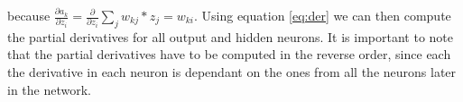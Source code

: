 \documentclass[11pt]{article}
\begin{document}
because $\frac{\partial a_k}{\partial z_i} = \frac{\partial}{\partial z_i} \sum_{j} w_{kj} * z_j = w_{ki}$.
Using equation \ref{eq:der} we can then compute the partial derivatives for all output and hidden neurons.
It is important to note that the partial derivatives have to be computed in the reverse order,
since each the derivative in each neuron is dependant on the ones from all the neurons later
in the network.
\end{document}
